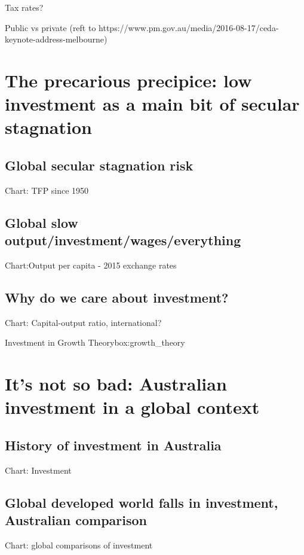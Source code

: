 Tax rates?

Public vs private
(reft to https://www.pm.gov.au/media/2016-08-17/ceda-keynote-address-melbourne) 


\chapter{The precarious precipice: low investment as a main bit of secular stagnation} \label{chap_a}

\section{Global secular stagnation risk}

Chart: TFP since 1950

\section{Global slow output/investment/wages/everything}

 Chart:Output per capita - 2015 exchange rates

\section{Why do we care about investment?}

Chart: Capital-output ratio, international?

\begin{smallbox}{Investment in Growth Theory}{box:growth_theory}
\end{smallbox}

\chapter{It's not so bad: Australian investment in a global context} \label{chap_b}

\section{History of investment in Australia}

Chart: Investment %

\section{Global developed world falls in investment, Australian comparison}

Chart: global comparisons of investment %

